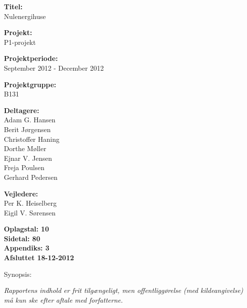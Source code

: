 \begin{minipage}[t]{0.48\textwidth}
\textbf{Titel:} \\[5pt]\bigskip\hspace{2ex}
Nulenergihuse

\textbf{Projekt:} \\[5pt]\bigskip\hspace{2ex}
P1-projekt

\textbf{Projektperiode:} \\[5pt]\bigskip\hspace{2ex}
September 2012 - December 2012

\textbf{Projektgruppe:} \\[5pt]\bigskip\hspace{2ex}
B131	

\textbf{Deltagere:} \\[5pt]\hspace*{2ex}
Adam  G. Hansen \\\hspace*{2ex}
Berit Jørgensen \\\hspace*{2ex}
Christoffer Haning \\\hspace*{2ex}
Dorthe Møller \\\hspace*{2ex}
Ejnar V. Jensen \\\hspace*{2ex}
Freja Poulsen \\\bigskip\hspace{2ex}
Gerhard Pedersen

\textbf{Vejledere:} \\[5pt]\hspace*{2ex}
Per K. Heiselberg \\\bigskip\hspace{2ex}
Eigil V. Sørensen

\vspace*{1cm}

\textbf{Oplagstal: 10} \\
\textbf{Sidetal: 80} \\
\textbf{Appendiks: 3} \\ 
\textbf{Afsluttet 18-12-2012}

\end{minipage}
\hfill
\begin{minipage}[t]{0.483\textwidth}
Synopsis: \\[5pt]
\fbox{\parbox{7cm}{\bigskip\bigskip}}
\end{minipage}

\vfill

{\footnotesize\itshape Rapportens indhold er frit tilgængeligt, men offentliggørelse (med kildeangivelse) må kun ske efter aftale med forfatterne.}